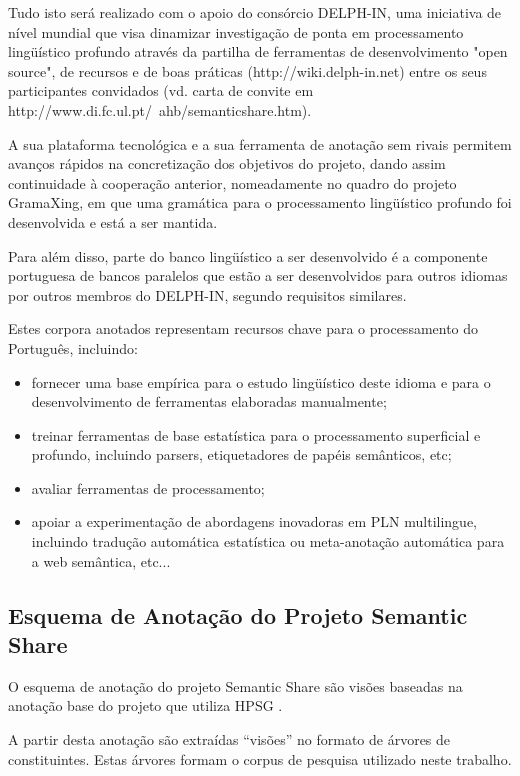 Tudo isto será realizado com o apoio do consórcio DELPH-IN, uma iniciativa de nível mundial que visa dinamizar investigação de ponta em processamento lingüístico profundo através da partilha de ferramentas de desenvolvimento "open source", de recursos e de boas práticas (http://wiki.delph-in.net) entre os seus participantes convidados (vd. carta de convite em http://www.di.fc.ul.pt/~ahb/semanticshare.htm).

A sua plataforma tecnológica e a sua ferramenta de anotação sem rivais permitem avanços rápidos na concretização dos objetivos do projeto, dando assim continuidade à cooperação anterior, nomeadamente no quadro do projeto GramaXing, em que uma gramática para o processamento lingüístico profundo foi desenvolvida e está a ser mantida.

Para além disso, parte do banco lingüístico a ser desenvolvido é a componente portuguesa de bancos paralelos que estão a ser desenvolvidos para outros idiomas por outros membros do DELPH-IN, segundo requisitos similares.


Estes corpora anotados representam recursos chave para o processamento do Português, incluindo:


\begin{itemize}
  \item fornecer uma base empírica para o estudo lingüístico deste idioma e para o desenvolvimento de ferramentas elaboradas manualmente;
  \item treinar ferramentas de base estatística para o processamento superficial e profundo, incluindo parsers, etiquetadores de papéis semânticos, etc;
  \item avaliar ferramentas de processamento;
  \item  apoiar a experimentação de abordagens inovadoras em PLN multilingue, incluindo tradução automática estatística ou meta-anotação automática para a web semântica, etc...
\end{itemize}



\subsection{Esquema de Anotação do Projeto Semantic Share} %
\label{sub:semantic_anotacao}

O esquema de anotação do projeto Semantic Share são visões baseadas na anotação base do projeto que utiliza HPSG \cite{branco08}.

A partir desta anotação são extraídas ``visões'' no formato de árvores de constituintes. Estas árvores formam o corpus de pesquisa utilizado neste trabalho.


